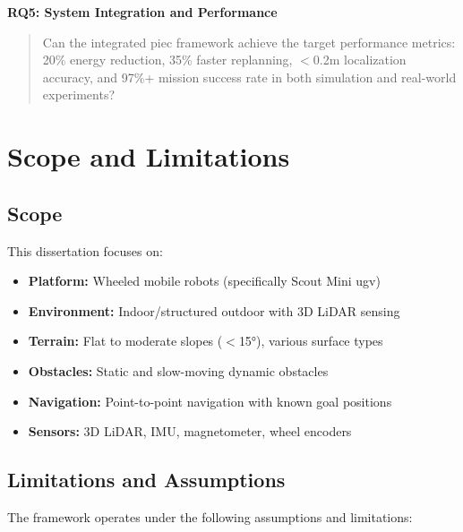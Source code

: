\textbf{RQ5: System Integration and Performance}
\begin{quote}
Can the integrated \acrshort{piec} framework achieve the target performance metrics: 20\% energy reduction, 35\% faster replanning, $<$0.2m localization accuracy, and 97\%+ mission success rate in both simulation and real-world experiments?
\end{quote}

\section{Scope and Limitations}
\label{sec:scope}

\subsection{Scope}

This dissertation focuses on:
\begin{itemize}
    \item \textbf{Platform:} Wheeled mobile robots (specifically Scout Mini \acrshort{ugv})
    \item \textbf{Environment:} Indoor/structured outdoor with 3D LiDAR sensing
    \item \textbf{Terrain:} Flat to moderate slopes ($<$15°), various surface types
    \item \textbf{Obstacles:} Static and slow-moving dynamic obstacles
    \item \textbf{Navigation:} Point-to-point navigation with known goal positions
    \item \textbf{Sensors:} 3D LiDAR, IMU, magnetometer, wheel encoders
\end{itemize}

\subsection{Limitations and Assumptions}

The framework operates under the following assumptions and limitations:

